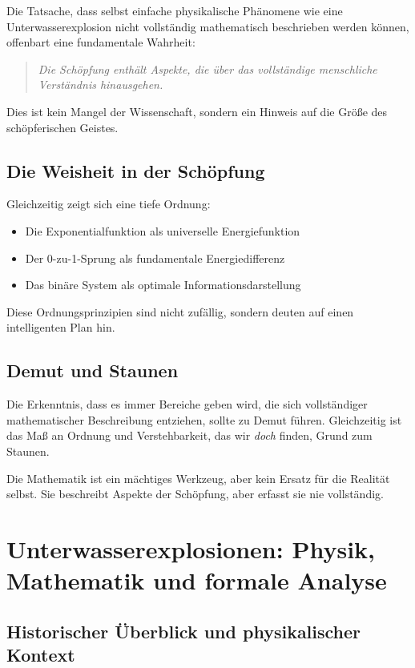 ﻿\documentclass[12pt,a4paper]{article}
\theoremstyle{definition}
\theoremstyle{remark}
\begin{document}
Die Tatsache, dass selbst einfache physikalische Phänomene wie eine Unterwasserexplosion nicht vollständig mathematisch beschrieben werden können, offenbart eine fundamentale Wahrheit:

\begin{quote}
\textit{Die Schöpfung enthält Aspekte, die über das vollständige menschliche Verständnis hinausgehen.}
\end{quote}

Dies ist kein Mangel der Wissenschaft, sondern ein Hinweis auf die Größe des schöpfer\-ischen Geistes.

\subsection{Die Weisheit in der Schöpfung}

Gleichzeitig zeigt sich eine tiefe Ordnung:
\begin{itemize}
\item Die Exponentialfunktion als universelle Energiefunktion
\item Der 0-zu-1-Sprung als fundamentale Energiedifferenz
\item Das binäre System als optimale Informationsdarstellung
\end{itemize}

Diese Ordnungsprinzipien sind nicht zufällig, sondern deuten auf einen intelligenten Plan hin.

\subsection{Demut und Staunen}

Die Erkenntnis, dass es immer Bereiche geben wird, die sich vollständiger mathematischer Beschreibung entziehen, sollte zu Demut führen. Gleichzeitig ist das Maß an Ordnung und Verstehbarkeit, das wir \textit{doch} finden, Grund zum Staunen.

Die Mathematik ist ein mächtiges Werkzeug, aber kein Ersatz für die Realität selbst. Sie beschreibt Aspekte der Schöpfung, aber erfasst sie nie vollständig.

\section{Unterwasserexplosionen: Physik, Mathematik und formale Analyse}
\label{sec:unterwasser}

\subsection{Historischer Überblick und physikalischer Kontext}
\end{document}
